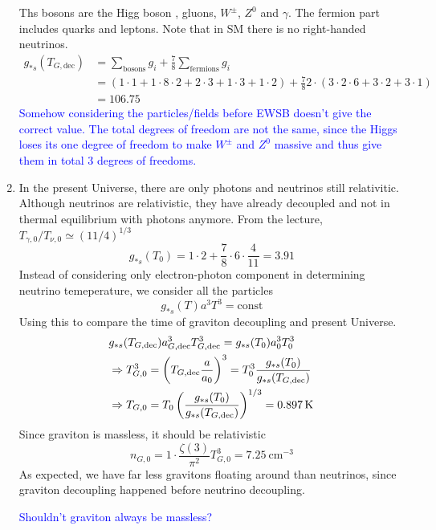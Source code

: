 \begin{enumerate}[label=\alph*)]
      Ths bosons are the Higg boson , gluons, $W^\pm$, $Z^0$ and $\gamma$. The fermion part includes quarks and leptons. Note that in SM there is no right-handed neutrinos.
      \begin{align}
         g_{*s } (T_{G,\text{dec}}) &= \sum_\text{bosons} g_i + \frac{7}{8} \sum_\text{fermions} g_i\\
                 &= (1 \cdot 1 +  1 \cdot 8 \cdot 2 + 2 \cdot 3 + 1 \cdot 3 + 1 \cdot 2) + \frac{7}{8} 2\cdot (3 \cdot 2 \cdot 6 + 3 \cdot 2 + 3 \cdot 1) \\
                 &= 106.75
      \end{align}
      \textcolor{blue}{Somehow considering the particles/fields before EWSB doesn't give the correct value. The total degrees of freedom are not the same, since the Higgs loses its one degree of freedom to make $W^{\pm}$ and $Z^0$ massive and thus give them in total $3$ degrees of freedoms.}
   \item In the present Universe, there are only photons and neutrinos still relativitic. Although neutrinos are relativistic, they have already decoupled and not in thermal equilibrium with photons anymore. From the lecture, $T_{\gamma, 0} / T_{\nu, 0} \simeq (11/4)^{1/3} $
      \begin{equation} 
         g_{*s}(T_0) = 1\cdot 2 + \frac{7}{8} \cdot 6 \cdot \frac{4}{11} = 3.91
   \end{equation}
   Instead of considering only electron-photon component in determining neutrino temeperature, we consider all the particles
   \begin{equation*}
      g_{*s}(T) a^3 T^3 = \text{const}
   \end{equation*}
   Using this to compare the time of graviton decoupling and present Universe.
   \begin{align}
     & g_{*s}(T_{G, \text{dec}}) a^3_{G, \text{dec}} T^3_{G, \text{dec}} = g_{*s}( T_0) a_0^3 T^3_0 \notag \\
     &\Rightarrow T_{G,0}^3 = \left( T_{G,\text{dec}} \frac{a}{a_0} \right)^3 = T_0^3 \frac{g_{*s}(T_0)}{g_{*s}(T_{G, \text{dec}})} \notag \\
     &\Rightarrow T_{G,0} = T_0 \left( \frac{g_{*s}(T_0)}{g_{*s}(T_{G, \text{dec}})} \right)^{1/3} = \SI{0.897}{\kelvin}
   \end{align}
   Since graviton is massless, it should be relativistic
   \begin{equation}
      n_{G,0} = 1\cdot \frac{\zeta(3)}{\pi^2} T_{G,0}^3 = \SI{7.25}{\cm\tothe{-3}}
   \end{equation}
   As expected, we have far less gravitons floating around than neutrinos, since graviton decoupling happened before neutrino decoupling.

   \textcolor{blue}{Shouldn't graviton always be massless?}
\end{enumerate}
